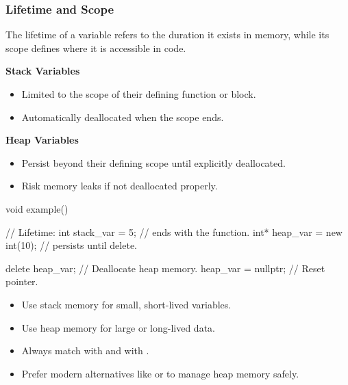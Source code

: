 \subsubsection{Lifetime and Scope}

The lifetime of a variable refers to the duration it exists in memory, while its scope defines where it is accessible in code.

\textbf{Stack Variables}
\begin{itemize}
    \item Limited to the scope of their defining function or block.
    \item Automatically deallocated when the scope ends.
\end{itemize}

\textbf{Heap Variables}
\begin{itemize}
    \item Persist beyond their defining scope until explicitly deallocated.
    \item Risk memory leaks if not deallocated properly.
\end{itemize}

\begin{exampleblock}
    \begin{codeblock}[language=C++]
void example() {                  //        Lifetime:
    int stack_var = 5;            // ends with the function.
    int* heap_var = new int(10);  // persists until delete.

    delete heap_var;              // Deallocate heap memory.
    heap_var = nullptr;           // Reset pointer.
}
    \end{codeblock}
\end{exampleblock}

\begin{tipsblock}
    \begin{itemize}
        \item Use stack memory for small, short-lived variables.
        \item Use heap memory for large or long-lived data.
        \item Always match  with  and  with .
        \item Prefer modern alternatives like  or  to manage heap memory safely.
    \end{itemize}
\end{tipsblock}

